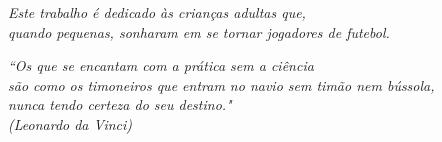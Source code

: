 \begin{folhadeaprovacao}

    
  
\end{folhadeaprovacao}

\begin{dedicatoria}
   \vspace*{20.0cm}
   \hspace{6.0cm} \parbox{10cm} {\textit{Este trabalho é dedicado às crianças adultas que,\\
   quando pequenas, sonharam em se tornar jogadores de futebol.}}
   \vspace*{\fill}
\end{dedicatoria}

\begin{agradecimentos}

    \lipsum[1]
\end{agradecimentos}

\begin{epigrafe}
    \vspace*{\fill}
	\begin{flushright}
		\textit{``Os que se encantam com a prática sem a ciência \\
        são como os timoneiros que entram no navio sem timão nem bússola,\\
       nunca tendo certeza do seu destino."\\
         (Leonardo da Vinci)}
 	\end{flushright}
\end{epigrafe}


